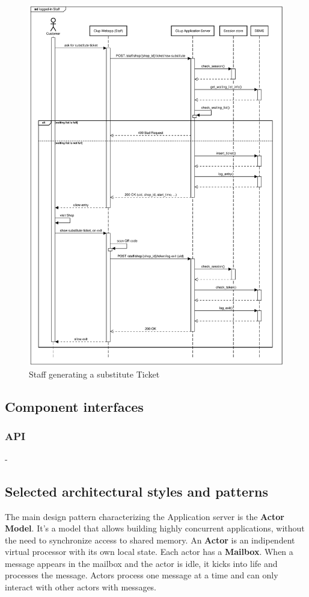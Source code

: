 \begin{figure}[H]
    \centering
    \includegraphics[width=1\textwidth]{Images/runtime_substitute.pdf}
    \caption{Staff generating a substitute Ticket}
\end{figure}

\subsection{Component interfaces}

\label{sect:api}
\subsubsection{API}
-


\label{sect:patterns}
\subsection{Selected architectural styles and patterns}
The main design pattern characterizing the Application server is the \textbf{Actor Model}\cite{10.5555/1624775.1624804}. It's a model that allows building highly concurrent applications, without the need to synchronize access to shared memory.
An \textbf{Actor} is an indipendent virtual processor with its own local state. Each actor has a \textbf{Mailbox}. When a message appears in the mailbox and the actor is idle, it kicks into life and processes the message\cite{pragmatic}. Actors process one message at a time and can only interact with other actors with messages.


